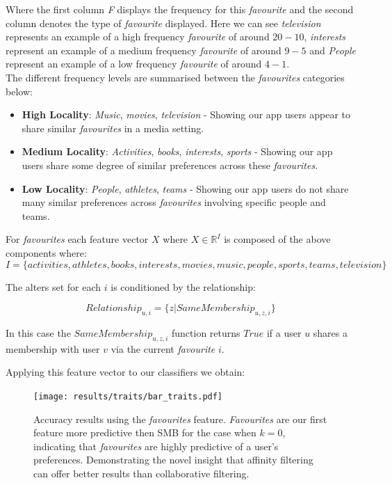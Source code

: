 Where the first column \emph{F} displays the frequency for this \emph{favourite} and the second column denotes the type of \emph{favourite} displayed. 
Here we can see \emph{television} represents an example of a high frequency \emph{favourite} of around $20-10$, \emph{interests} represent an example of a 
medium frequency \emph{favourite} of around $9-5$ and \emph{People} represent an example of a low frequency \emph{favourite} of around $4-1$.
\\ 

The different frequency levels are summarised between the \emph{favourites} categories below:
\begin{itemize}
\item \textbf{High Locality}: \emph{Music}, \emph{movies}, \emph{television} - Showing our app users appear to share similar \emph{favourites} in a media 
setting.
\item \textbf{Medium Locality}: \emph{Activities}, \emph{books}, \emph{interests}, \emph{sports} - Showing our app users share some degree of similar preferences 
across these \emph{favourites}.
\item \textbf{Low Locality}: \emph{People}, \emph{athletes}, \emph{teams} - Showing our app users do not share many similar preferences  
across \emph{favourites} involving specific people and teams.
\end{itemize}

For \emph{favourites} each feature vector $X$ where $X \in \mathbb{R}^I$ is composed of the above components where:
\[ I = \{activities, athletes, books, interests, movies, music, people, sports, teams, television\} \]

The alters set for each $i$ is conditioned by the relationship:

\[ Relationship_{u,i} = \{z | SameMembership_{u,z,i}\} \]

In this case the $SameMembership_{u,z,i}$ function returns $True$ if a user $u$ shares a membership with user $v$ via the current \emph{favourite} $i$.

Applying this feature vector to our classifiers we obtain:

\begin{figure}[h]
	\begin{center}
		\texttt{[image: results/traits/bar\_traits.pdf]}
		\caption{Accuracy results using the \emph{favourites} feature. \emph{Favourites} are our first feature more predictive then SMB
				 for the case when $k=0$, indicating that \emph{favourites} are highly predictive of a user's preferences. Demonstrating the 
		novel insight that affinity filtering can offer better results than collaborative filtering.}
	\end{center}
\end{figure}

